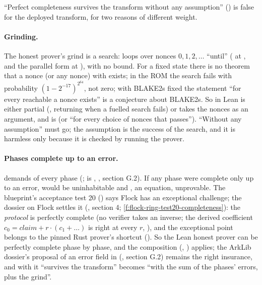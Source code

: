 ``Perfect completeness survives the transform without any assumption'' () is
false for the deployed transform, for two reasons of different weight.

\paragraph{Grinding.} The honest prover's grind is a search: 
 loops over nonces $0, 1, 2, …$ ``until'' 
( at , and the parallel form at ), with no
bound. For a fixed state  there is no theorem that a  nonce (or any nonce) with
 exists; in the ROM the search fails with
probability $(1 − 2^{−17})^{2^{64}}$, not zero; with BLAKE2s fixed the statement ``for every reachable
 a nonce exists'' is a conjecture about BLAKE2s. So  in Lean is
either partial (, returning  when a fuelled search fails) or takes the
nonces as an argument, and  is
 (or ``for every choice of nonces that passes'').
``Without any assumption'' must go; the assumption is the success of the search, and it is harmless
only because it is checked by running the prover.

\paragraph{Phases complete up to an error.}  demands
 of every phase (;
 is , , section G.2).
If any phase were complete only up to an error,  would be uninhabitable and
, an equation, unprovable. The blueprint's acceptance test 20
() says Flock has an exceptional challenge; the dossier on Flock settles it
(, section 4; \cref{f:flock-ring-test20-completeness}): the \emph{protocol}
is perfectly complete (no verifier takes an inverse; the derived coefficient
$c_0 = \mathit{claim} + r·(c_1 + …)$ is right at every $r$, ), and the
exceptional point belongs to the pinned Rust prover's shortcut (). So the
Lean honest prover can be perfectly complete phase by phase, and the composition
(, ) applies; the ArkLib
dossier's proposal of an error field in  (, section
G.2) remains the right insurance, and with it ``survives the transform'' becomes ``with the sum of
the phases' errors, plus the grind''.

